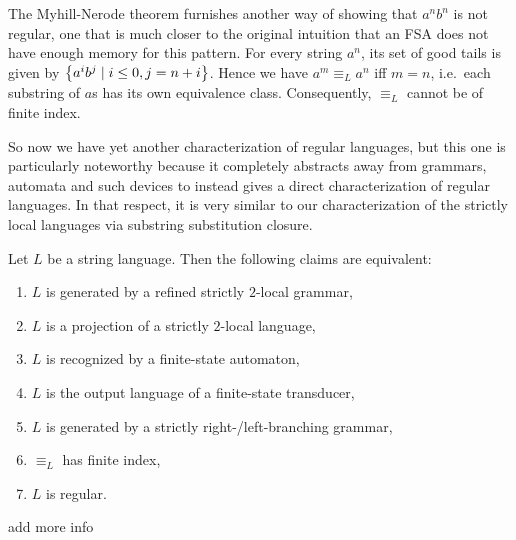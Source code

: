 The Myhill-Nerode theorem furnishes another way of showing that $a^n b^n$ is not regular, one that is much closer to the original intuition that an FSA does not have enough memory for this pattern.
For every string $a^n$, its set of good tails is given by $\left \{ a^i b^j \mid i \leq 0, j = n+i \right \}$.
Hence we have $a^m \equiv_L a^n$ iff $m = n$, i.e.\ each substring of $a$s has its own equivalence class.
Consequently, $\equiv_L$ cannot be of finite index.

So now we have yet another characterization of regular languages, but this one is particularly noteworthy because it completely abstracts away from grammars, automata and such devices to instead gives a direct characterization of regular languages. 
In that respect, it is very similar to our characterization of the strictly local languages via substring substitution closure.
%
\begin{corollary}
    Let $L$ be a string language.
    Then the following claims are equivalent:
    \begin{enumerate}
        \item $L$ is generated by a refined strictly $2$-local grammar,
        \item $L$ is a projection of a strictly $2$-local language,
        \item $L$ is recognized by a finite-state automaton,
        \item $L$ is the output language of a finite-state transducer,
        \item $L$ is generated by a strictly right-\slash left-branching grammar,
        \item $\equiv_L$ has finite index,
        \item $L$ is regular.
    \end{enumerate}
\end{corollary}


\begin{literature}
add more info
\end{literature}

